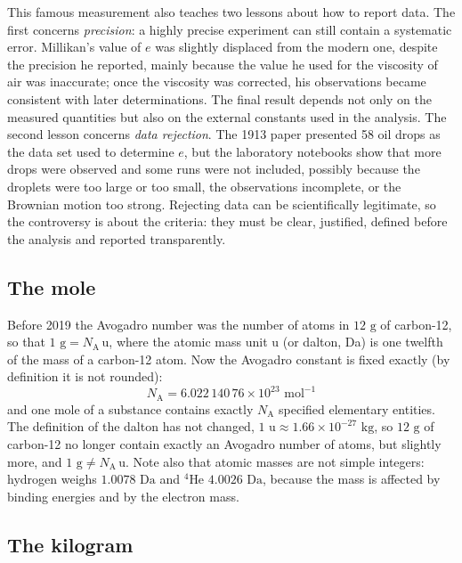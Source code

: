 \documentclass[letterpaper,11pt,leqno]{book}
\begin{document}
This famous measurement also teaches two lessons about how to report data. The first concerns \emph{precision}: a highly precise experiment can still contain a systematic error. Millikan's value of $e$ was slightly displaced from the modern one, despite the precision he reported, mainly because the value he used for the viscosity of air was inaccurate; once the viscosity was corrected, his observations became consistent with later determinations. The final result depends not only on the measured quantities but also on the external constants used in the analysis. The second lesson concerns \emph{data rejection}. The 1913 paper presented 58 oil drops as the data set used to determine $e$, but the laboratory notebooks show that more drops were observed and some runs were not included, possibly because the droplets were too large or too small, the observations incomplete, or the Brownian motion too strong. Rejecting data can be scientifically legitimate, so the controversy is about the criteria: they must be clear, justified, defined before the analysis and reported transparently.

\subsection{The mole}

Before 2019 the Avogadro number was the number of atoms in $12\text{ g}$ of carbon-12, so that $1\text{ g} = N_{\text{A}}\,\text{u}$, where the atomic mass unit $\text{u}$ (or dalton, Da) is one twelfth of the mass of a carbon-12 atom. Now the Avogadro constant is fixed exactly (by definition it is not rounded):
\begin{equation}
\boxed{N_{\text{A}} = 6.022\,140\,76 \times 10^{23}\text{ mol}^{-1}}
\label{eq:avogadro_def}
\end{equation}
and one mole of a substance contains exactly $N_{\text{A}}$ specified elementary entities. The definition of the dalton has not changed, $1\text{ u} \approx 1.66 \times 10^{-27}\text{ kg}$, so $12\text{ g}$ of carbon-12 no longer contain exactly an Avogadro number of atoms, but slightly more, and $1\text{ g} \neq N_{\text{A}}\,\text{u}$. Note also that atomic masses are not simple integers: hydrogen weighs $1.0078\text{ Da}$ and $^4$He $4.0026\text{ Da}$, because the mass is affected by binding energies and by the electron mass.

\subsection{The kilogram}
\end{document}
